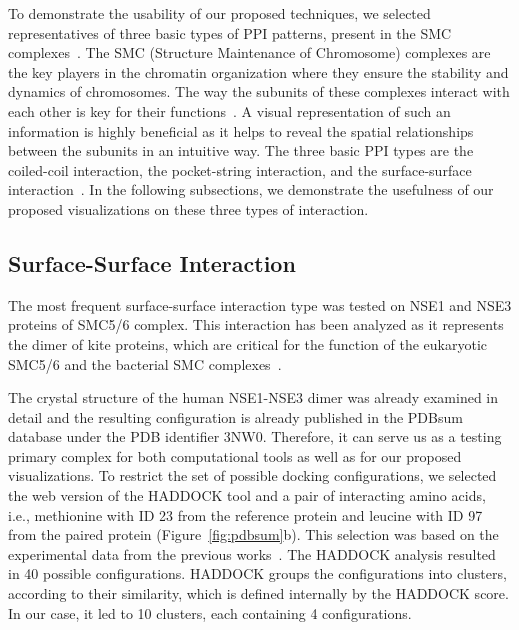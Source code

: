 \documentclass{bmcart}
\begin{document}
To demonstrate the usability of our proposed techniques, we selected representatives of three basic types of PPI patterns,  present in the SMC complexes~\cite{Palecek2015}. 
The SMC (Structure Maintenance of Chromosome) complexes are the key players in the chromatin organization where they ensure the stability and dynamics of chromosomes. The way the subunits of these complexes interact with each other is key for their functions~\cite{Gligoris}.
A visual representation of such an information is highly beneficial as it helps to reveal the spatial relationships between the subunits in an intuitive way.
The three basic PPI types are the coiled-coil interaction, the pocket-string interaction, and the surface-surface interaction~\cite{alberts02molecular}.
In the following subsections, we demonstrate the usefulness of our proposed visualizations on these three types of interaction.

\subsection*{Surface-Surface Interaction}
The most frequent surface-surface interaction type was tested on NSE1 and NSE3 proteins of SMC5/6 complex. 
This interaction has been analyzed as it represents the dimer of kite proteins, which are critical for the function of the eukaryotic SMC5/6 and the bacterial SMC complexes~\cite{Zabrady2016,Palecek2015,Doyle2010}. 

The crystal structure of the human NSE1-NSE3 dimer was already examined in detail and the resulting configuration is already published in the PDBsum database under the PDB identifier 3NW0. 
Therefore, it can serve us as a testing primary complex for both computational tools as well as for our proposed visualizations.
To restrict the set of possible docking configurations, we selected the web version of the HADDOCK tool and a pair of interacting amino acids, i.e., methionine with ID 23 from the reference protein and leucine with ID 97 from the paired protein (Figure~\ref{fig:pdbsum}b).
This selection was based on the experimental data from the previous works~\cite{Doyle2010,Hudson2011,Kozakova,Crabben}.
The HADDOCK analysis resulted in 40 possible configurations.
HADDOCK groups the configurations into clusters, according to their similarity, which is defined internally by the HADDOCK score.
In our case, it led to 10 clusters, each containing 4 configurations.
\end{document}
